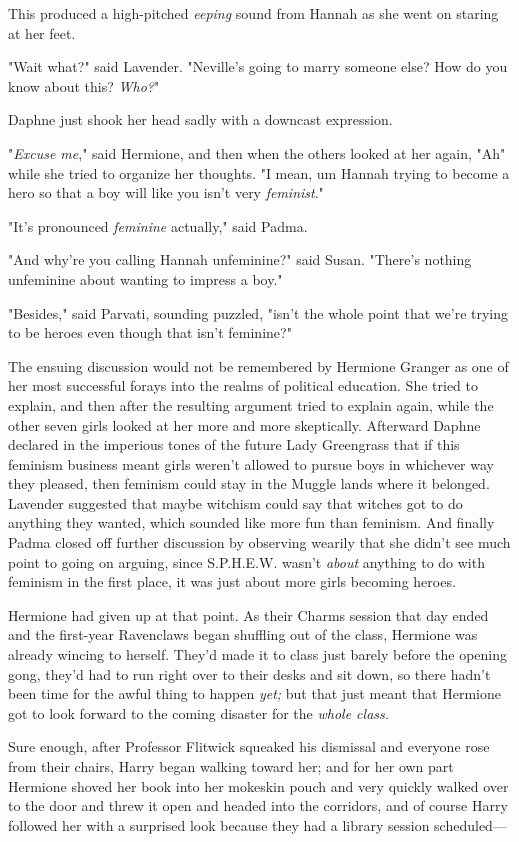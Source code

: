 This produced a high-pitched \emph{eeping} sound from Hannah as she went on
staring at her feet.

"Wait what?" said Lavender. "Neville's going to marry someone else? How do you
know about this? \emph{Who?}"

Daphne just shook her head sadly with a downcast expression.

"\emph{Excuse me}," said Hermione, and then when the others looked at her
again, "Ah{\el}" while she tried to organize her thoughts. "I mean,
um{\el} Hannah{\el} trying to become a hero so that a boy will like you
isn't very \emph{feminist}."

"It's pronounced \emph{feminine} actually," said Padma.

"And why're you calling Hannah unfeminine?" said Susan. "There's nothing
unfeminine about wanting to impress a boy."

"Besides," said Parvati, sounding puzzled, "isn't the whole point that we're
trying to be heroes even though that isn't feminine?"

The ensuing discussion would not be remembered by Hermione Granger as one of
her most successful forays into the realms of political education. She tried to
explain, and then after the resulting argument tried to explain again, while
the other seven girls looked at her more and more skeptically. Afterward Daphne
declared in the imperious tones of the future Lady Greengrass that if this
feminism business meant girls weren't allowed to pursue boys in whichever way
they pleased, then feminism could stay in the Muggle lands where it belonged.
Lavender suggested that maybe witchism could say that witches got to do
anything they wanted, which sounded like more fun than feminism. And finally
Padma closed off further discussion by observing wearily that she didn't see
much point to going on arguing, since S.P.H.E.W. wasn't \emph{about} anything
to do with feminism in the first place, it was just about more girls becoming
heroes.

Hermione had given up at that point.
\sbreak
As their Charms session that day ended and the first-year Ravenclaws began
shuffling out of the class, Hermione was already wincing to herself. They'd
made it to class just barely before the opening gong, they'd had to run right
over to their desks and sit down, so there hadn't been time for the awful thing
to happen \emph{yet;} but that just meant that Hermione got to look forward to
the coming disaster for the \emph{whole class.}

Sure enough, after Professor Flitwick squeaked his dismissal and everyone rose
from their chairs, Harry began walking toward her; and for her own part
Hermione shoved her book into her mokeskin pouch and very quickly walked over
to the door and threw it open and headed into the corridors, and of course
Harry followed her with a surprised look because they had a library session
scheduled---

